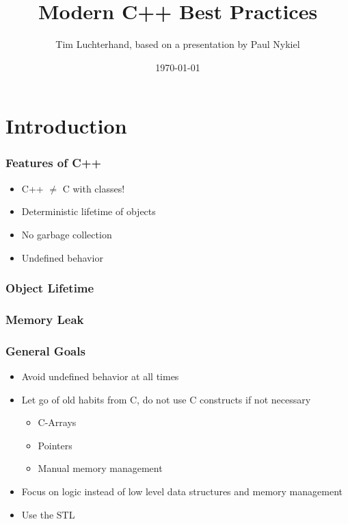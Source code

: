 \documentclass[usenames,dvipsnames,svgnames,table,aspectratio=169]{beamer}
\title{Modern C++ Best Practices}
\author{Tim Luchterhand, based on a presentation by Paul Nykiel \cite{Nykiel2020}}
\date{\today}
\begin{document}
\maketitle

\frame{
    \tableofcontents
}

\section{Introduction}
\begin{frame}
    \frametitle{Features of C++}
    \begin{itemize}
        \item<+-> C++ $\neq$ C with classes!
        \item<+-> Deterministic lifetime of objects
        \item<+-> No garbage collection
        \item<+-> Undefined behavior
    \end{itemize}
\end{frame}

\begin{frame}
    \frametitle{Object Lifetime}
    
\end{frame}

\begin{frame}
    \frametitle{Memory Leak}
    
\end{frame}

\begin{frame}
    \frametitle{General Goals}
    \begin{itemize}
        \item<+-> Avoid undefined behavior at all times
        \item<+-> Let go of old habits from C, do not use C constructs if not necessary
        \begin{itemize}
            \item<+-> C-Arrays
            \item<+-> Pointers
            \item<+-> Manual memory management
        \end{itemize}
        \item<+-> Focus on logic instead of low level data structures and memory management
        \item<+-> Use the STL
    \end{itemize}
\end{frame}
\end{document}
